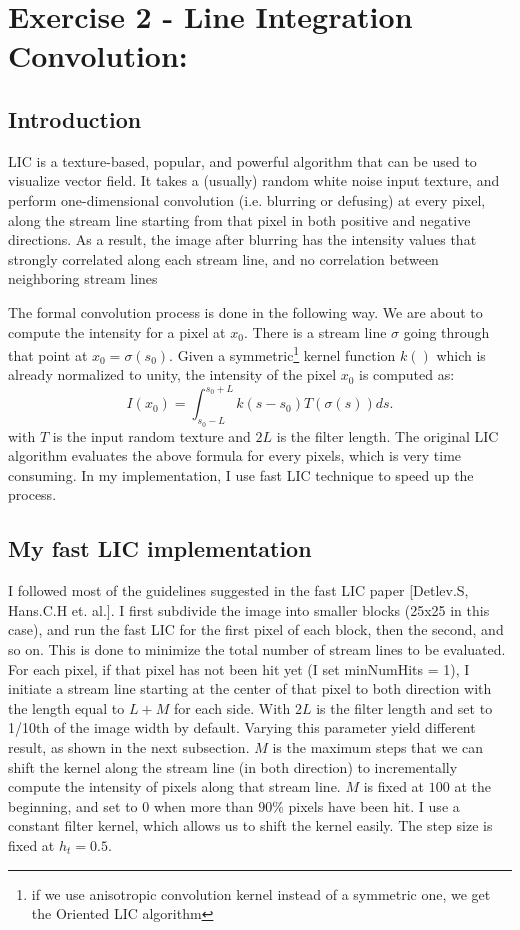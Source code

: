 \documentclass[10pt,a4paper]{article}
\begin{document}
		\section{Exercise 2 - Line Integration Convolution:}
		\subsection{Introduction}
			LIC is a texture-based, popular, and powerful algorithm that can be used to visualize vector field. It takes a (usually) random white noise input texture, and perform one-dimensional convolution (i.e. blurring or defusing) at every pixel, along the stream line starting from that pixel in both positive and negative directions. As a result, the image after blurring has the intensity values that strongly correlated along each stream line, and no correlation between neighboring stream lines
			
			The formal convolution process is done in the following way. We are about to compute the intensity for a pixel at $x_0$. There is a stream line $\sigma$ going through that point at $x_0 = \sigma(s_0)$. Given a symmetric\footnote{if we use anisotropic convolution kernel instead of a symmetric one, we get the Oriented LIC algorithm} kernel function $k()$ which is already normalized to unity, the intensity of the pixel $x_0$ is computed as:
			\begin{equation}
				I(x_0) = \int_{s_0 - L}^{s_0+L}k(s-s_0)T(\sigma(s)) ds.
			\end{equation}
			with $T$ is the input random texture and $2L$ is the filter length. The original LIC algorithm evaluates the above formula for every pixels, which is very time consuming. In my implementation, I use fast LIC technique to speed up the process.
		\subsection{My fast LIC implementation}
			I followed most of the guidelines suggested in the fast LIC paper [Detlev.S, Hans.C.H et. al.]. I first subdivide the image into smaller blocks (25x25 in this case), and run the fast LIC for the first pixel of each block, then the second, and so on. This is done to minimize the total number of stream lines to be evaluated. For each pixel, if that pixel has not been hit yet (I set minNumHits = 1), I initiate a stream line starting at the center of that pixel to both direction with the length equal to $L + M$ for each side. With $2L$ is the filter length and set to 1/10th of the image width by default. Varying this parameter yield different result, as shown in the next subsection. $M$ is the maximum steps that we can shift the kernel along the stream line (in both direction) to incrementally compute the intensity of pixels along that stream line. $M$ is fixed at $100$ at the beginning, and set to $0$ when more than $90\%$ pixels have been hit. I use a constant filter kernel, which allows us to shift the kernel easily. The step size is fixed at $h_t = 0.5$.
			
\end{document}
